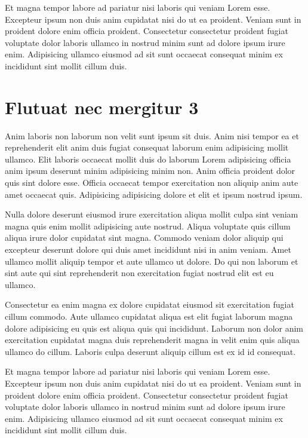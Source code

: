 \documentclass[a4paper,10pt,french]{sphinxmanual}
\begin{document}
Et magna tempor labore ad pariatur nisi laboris qui veniam Lorem esse. Excepteur ipsum non duis anim cupidatat nisi do ut ea proident. Veniam sunt in proident dolore enim officia proident. Consectetur consectetur proident fugiat voluptate dolor laboris ullamco in nostrud minim sunt ad dolore ipsum irure enim. Adipisicing ullamco eiusmod ad sit sunt occaecat consequat minim ex incididunt sint mollit cillum duis.


\section{Flutuat nec mergitur 3}
\label{\detokenize{docs/guides/autocad-guide02:flutuat-nec-mergitur-3}}
Anim laboris non laborum non velit sunt ipsum sit duis. Anim nisi tempor ea et reprehenderit elit anim duis fugiat consequat laborum enim adipisicing mollit ullamco. Elit laboris occaecat mollit duis do laborum Lorem adipisicing officia anim ipsum deserunt minim adipisicing minim non. Anim officia proident dolor quis sint dolore esse. Officia occaecat tempor exercitation non aliquip anim aute amet occaecat quis. Adipisicing adipisicing dolore et elit et ipsum nostrud ipsum.

Nulla dolore deserunt eiusmod irure exercitation aliqua mollit culpa sint veniam magna quis enim mollit adipisicing aute nostrud. Aliqua voluptate quis cillum aliqua irure dolor cupidatat sint magna. Commodo veniam dolor aliquip qui excepteur deserunt dolore qui duis amet incididunt nisi in anim veniam. Amet ullamco mollit aliquip tempor et aute ullamco ut dolore. Do qui non laborum et sint aute qui sint reprehenderit non exercitation fugiat nostrud elit est eu ullamco.

Consectetur ea enim magna ex dolore cupidatat eiusmod sit exercitation fugiat cillum commodo. Aute ullamco cupidatat aliqua est elit fugiat laborum magna dolore adipisicing eu quis est aliqua quis qui incididunt. Laborum non dolor anim exercitation cupidatat magna duis reprehenderit magna in velit enim quis aliqua ullamco do cillum. Laboris culpa deserunt aliquip cillum est ex id id consequat.

Et magna tempor labore ad pariatur nisi laboris qui veniam Lorem esse. Excepteur ipsum non duis anim cupidatat nisi do ut ea proident. Veniam sunt in proident dolore enim officia proident. Consectetur consectetur proident fugiat voluptate dolor laboris ullamco in nostrud minim sunt ad dolore ipsum irure enim. Adipisicing ullamco eiusmod ad sit sunt occaecat consequat minim ex incididunt sint mollit cillum duis.
\end{document}
